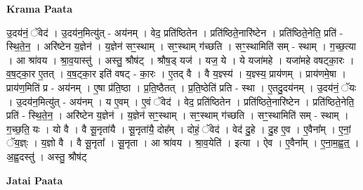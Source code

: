 \documentclass[17pt]{extarticle}
\begin{document}
\textbf{Krama Paata} \newline

उ॒दय॑नं॒ ॅवेद॑ । उ॒दय॑न॒मित्यु॑त् - अय॑नम् । वेद॒ प्रति॑ष्ठितेन । प्रति॑ष्ठिते॒नारि॑ष्टेन । प्रति॑ष्ठिते॒नेति॒ प्रति॑ - स्थि॒ते॒न॒ । अरि॑ष्टेन य॒ज्ञेन॑ । य॒ज्ञेन॑ सꣳ॒॒स्थाम् । सꣳ॒॒स्थाम् ग॑च्छति । सꣳ॒॒स्थामिति॑ सम् - स्थाम् । ग॒च्छ॒त्या । आ श्रा॑वय । श्रा॒व॒यास्तु॑ । अस्तु॒ श्रौष॑ट् । श्रौष॒ड् यज॑ । यज॒ ये । ये यजा॑महे । यजा॑महे वषट्का॒रः । व॒ष॒ट्का॒र ए॒तत् । व॒ष॒ट्का॒र इति॑ वषट् - का॒रः । ए॒तद् वै । वै य॒ज्ञ्स्य॑ । य॒ज्ञ्स्य॒ प्राय॑णम् । प्राय॑णमे॒षा । प्राय॑ण॒मिति॑ प्र - अय॑नम् । ए॒षा प्र॑ति॒ष्ठा । प्र॒ति॒ष्ठैतत् । प्र॒ति॒ष्ठेति॑ प्रति - स्था । ए॒तदु॒दय॑नम् । उ॒दय॑नं॒ ॅयः । उ॒दय॑न॒मित्यु॑त् - अय॑नम् । य ए॒वम् । ए॒वं ॅवेद॑ । वेद॒ प्रति॑ष्ठितेन । प्रति॑ष्ठिते॒नारि॑ष्टेन । प्रति॑ष्ठिते॒नेति॒ प्रति॑ - स्थि॒ते॒न॒ । अरि॑ष्टेन य॒ज्ञेन॑ । य॒ज्ञेन॑ सꣳ॒॒स्थाम् । सꣳ॒॒स्थाम् ग॑च्छति । सꣳ॒॒स्थामिति॑ सम् - स्थाम् । ग॒च्छ॒ति॒ यः । यो वै । वै सू॒नृता॑यै । सू॒नृता॑यै॒ दोह᳚म् । दोहं॒ ॅवेद॑ । वेद॑ दु॒हे । दु॒ह ए॒व । ए॒वैना᳚म् । ए॒नां॒ ॅय॒ज्ञ्ः । य॒ज्ञो वै । वै सू॒नृता᳚ । सू॒नृता । आ श्रा॑वय । श्रा॒व॒येति॑ । इत्या । ऐव । ए॒वैना᳚म् । ए॒ना॒म॒ह्व॒त्॒ । अ॒ह्व॒दस्तु॑ । अस्तु॒ श्रौष॑ट् \newline

\textbf{Jatai Paata} \newline
\end{document}
